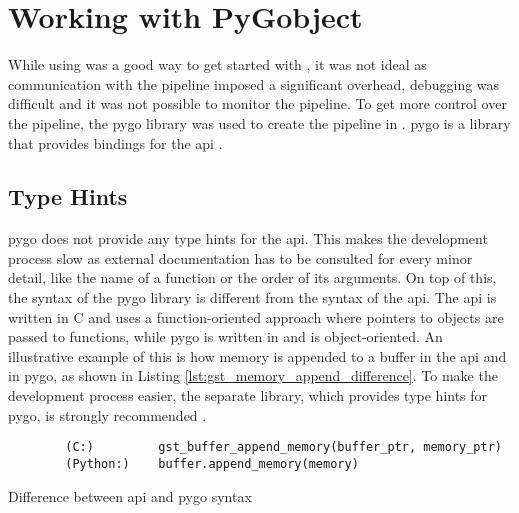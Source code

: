 \section{Working with PyGobject}
While using  was a good way to get started with \gs, it was not ideal as communication with the pipeline imposed a significant overhead, debugging was difficult and it was not possible to monitor the pipeline.
To get more control over the pipeline, the \gls{pygo} library was used to create the pipeline in \py.
\gls{pygo} is a \py library that provides bindings for the \gs \gls{api} \cite{OverviewPyGObject}.

\subsection{Type Hints}
\gls{pygo} does not provide any type hints for the \gs \gls{api}.
This makes the development process slow as external documentation has to be consulted for every minor detail, like the name of a function or the order of its arguments.
On top of this, the syntax of the \gls{pygo} library is different from the syntax of the \gs \gls{api}.
The \gls{api} is written in C and uses a function-oriented approach where pointers to objects are passed to functions, while \gls{pygo} is written in \py and is object-oriented.
An illustrative example of this is how memory is appended to a buffer in the \gs \gls{api} and in \gls{pygo}, as shown in Listing \ref{lst:gst_memory_append_difference}.
To make the development process easier, the separate  library, which provides type hints for \gls{pygo}, is strongly recommended \cite{pygobjectTypingStubsPyGObject2023}.

\begin{listing}[H]
    \begin{verbatim}
        (C:)         gst_buffer_append_memory(buffer_ptr, memory_ptr)
        (Python:)    buffer.append_memory(memory)
    \end{verbatim}
    \caption{Difference between \gs \gls{api} and \gls{pygo} syntax}
    \label{lst:gst_memory_append_difference}
\end{listing}
